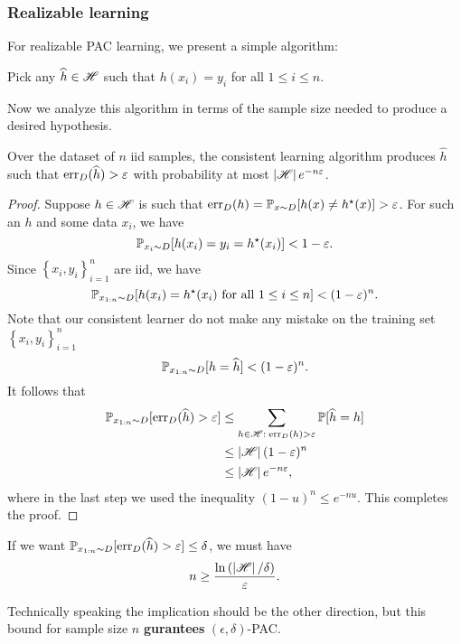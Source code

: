 \documentclass[a4paper]{article}
\begin{document}
\subsubsection{Realizable learning}

For realizable PAC learning, we present a simple algorithm:
\begin{algorithm}
Pick any $\widehat{h} \in \mathscr{H}$ such that $h(x_i) = y_i$ 
for all $1 \leq i \leq n$.
\end{algorithm}
Now we analyze this algorithm in terms of the sample size needed 
to produce a desired hypothesis.

\begin{thm}
  Over the dataset of $n$ iid samples,
  the consistent learning algorithm produces $\hat{h}$ such 
  that $\operatorname{err}_D(\widehat{h}) > \varepsilon$ with probability
  at most $\left\lvert \mathscr{H}\right\rvert e^{-n\varepsilon}$. 
\end{thm}
\begin{proof}
  Suppose $h \in \mathscr{H}$ is such that 
  $\operatorname{err}_D(h) = \mathbb{P}_{x \sim D} [h(x) \neq h^\star(x)] > \varepsilon$.
  For such an $h$ and some data $x_i$, we have 
  \[
  \mathbb{P}_{x_i \sim D} [h(x_i) = y_i = h^\star(x_i)] < 1 - \varepsilon.
  \]
  Since $\left\{ x_i, y_i \right\}_{i=1}^n$ are iid, we have 
  \[
  \mathbb{P}_{x_{1:n} \sim D}[h(x_i) = h^\star(x_i) \text{ for all 
  $1 \leq i \leq n$}] < (1 - \varepsilon)^n.
  \]
  Note that our consistent learner do not make any mistake 
  on the training set $\left\{ x_i, y_i \right\}_{i=1}^n$
  \[
  \mathbb{P}_{x_{1 : n} \sim D} [h = \widehat{h}] < (1 - \varepsilon)^n.
  \]
  It follows that 
  \[
  \begin{aligned}
    \mathbb{P}_{x_{1 : n} \sim D} [\operatorname{err}_D (\widehat{h}) > \varepsilon] 
    & \leq \sum_{h \in \mathscr{H}: \; \operatorname{err}_D(h) > \varepsilon} 
    \mathbb{P}[\widehat{h} = h]  \\
    & \leq \left\lvert \mathscr{H}\right\rvert (1 - \varepsilon)^n \\
    & \leq \left\lvert \mathscr{H}\right\rvert e^{-n\varepsilon},
  \end{aligned}
  \]
  where in the last step we used the inequality 
  $(1 - u)^n \leq e^{-nu}$. This completes the proof.
\end{proof}

\begin{cor}
  If we want $\mathbb{P}_{x_{1 : n} \sim D} [\operatorname{err}_D (\widehat{h}) > \varepsilon]
  \leq \delta$, we must have 
  \[
  n \geq \frac{\ln \left( \left\lvert \mathscr{H}\right\rvert / \delta \right)}{\varepsilon}.
  \]
\end{cor}
Technically speaking the implication should be the other direction, 
but this bound for sample size $n$ 
\textbf{gurantees} $(\epsilon, \delta)$-PAC.
\end{document}
